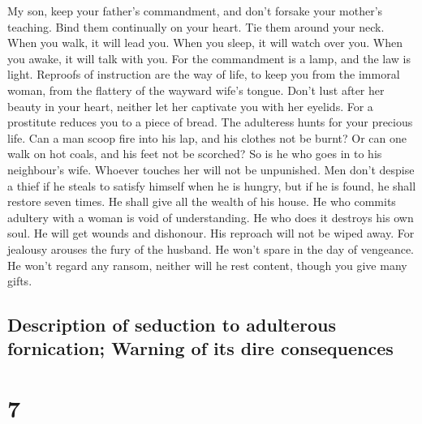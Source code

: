  My son, keep your father's commandment, and don't
forsake your mother's teaching.  Bind them continually on
your heart. Tie them around your neck.  When you walk, it
will lead you. When you sleep, it will watch over you. When you awake,
it will talk with you.  For the commandment is a lamp,
and the law is light. Reproofs of instruction are the way of life,
 to keep you from the immoral woman, from the flattery of
the wayward wife's tongue.  Don't lust after her beauty
in your heart, neither let her captivate you with her eyelids.
 For a prostitute reduces you to a piece of bread. The
adulteress hunts for your precious life.  Can a man scoop
fire into his lap, and his clothes not be burnt?  Or can
one walk on hot coals, and his feet not be scorched?  So
is he who goes in to his neighbour's wife. Whoever touches her will not
be unpunished.  Men don't despise a thief if he steals to
satisfy himself when he is hungry,  but if he is found,
he shall restore seven times. He shall give all the wealth of his house.
 He who commits adultery with a woman is void of
understanding. He who does it destroys his own soul.  He
will get wounds and dishonour. His reproach will not be wiped away.
 For jealousy arouses the fury of the husband. He won't
spare in the day of vengeance.  He won't regard any
ransom, neither will he rest content, though you give many gifts.

\hypertarget{description-of-seduction-to-adulterous-fornication-warning-of-its-dire-consequences}{%
\subsection{Description of seduction to adulterous fornication; Warning
of its dire
consequences}\label{description-of-seduction-to-adulterous-fornication-warning-of-its-dire-consequences}}

\hypertarget{section-6}{%
\section{7}\label{section-6}}

